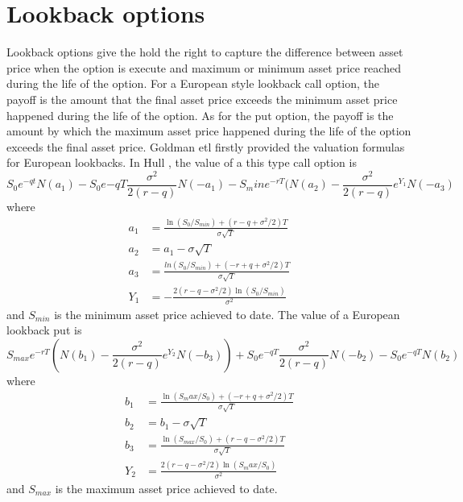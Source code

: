 \documentclass[11pt]{book}
\begin{document}
\section{Lookback options}
Lookback options give the hold the right to capture the difference between asset price when the option is execute and maximum or minimum asset price reached during the life of the option. For a European style lookback call option, the payoff is the amount that the final asset price exceeds the minimum asset price happened during the life of the option. As for the put option, the payoff is the amount by which the maximum asset price happened during the life of the option exceeds the final asset price. Goldman etl firstly provided the valuation formulas for European lookbacks. In Hull \cite{Hull2008}, the value of a this type call option is 
\begin{equation}\label{eq:3}
S_0e^{-qt}N(a_1) - S_0 e{-qT}\frac{\sigma ^2}{2(r-q)} N(-a_1) - S_min e^{-rT}(N(a_2) - \frac{\sigma^2}{2(r-q)} e ^{Y_1} N(-a_3) 
\end{equation}
where
\begin{equation}\label{eq:4}
\begin{split}
a_1 &=\frac{\ln(S_0 / S_{min}) + (r-q+\sigma^2 /2)T}{\sigma \sqrt{T}}\\
a_2 &= a_1 - \sigma \sqrt{T}\\
a_3 &= \frac{ln(S_0 / S_{min})+ (-r+q+\sigma^2 / 2)T}{\sigma \sqrt{T}}\\
Y_1 &= - \frac{2(r-q-\sigma^2 / 2) \ln(S_0 / S_{min})}{\sigma^2}
\end{split}
\end{equation}
and $S_{min}$ is the minimum asset price achieved to date. 
The value of a European lookback put is 
\begin{equation}\label{eq:5}
S_{max} e^{-rT} ( N(b_1) - \frac{\sigma^2}{2(r-q)} e^{Y_2} N(-b_3)) + S_0 e^{-qT}\frac{\sigma^2}{2(r-q)} N(-b_2) - S_0 e^{-qT} N(b_2)
\end{equation}
where 
\begin{equation}\label{eq:6}
\begin{split}
b_1 &= \frac{\ln(S_max / S_0) + (-r + q + \sigma^2 /2)T}{\sigma \sqrt{T}}\\
b_2 &= b_1 - \sigma \sqrt{T}\\
b_3 &= \frac{\ln(S_{max} / S_0) + (r-q-\sigma^2 /2)T}{\sigma \sqrt{T}}\\
Y_2 &= \frac{2(r-q-\sigma^2 / 2) \ln(S_max / S_0)}{\sigma^2}
\end{split}
\end{equation}
and $S_{max}$ is the maximum asset price achieved to date. 
\end{document}
